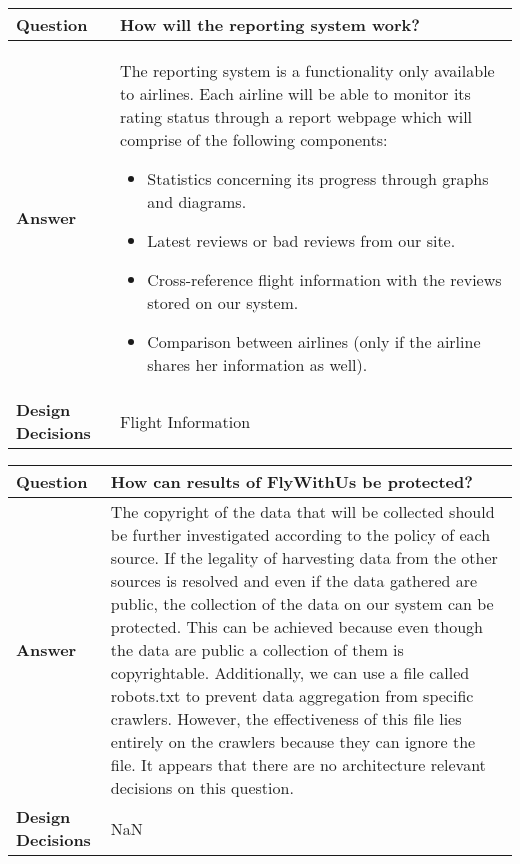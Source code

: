 \clearpage

\begin{longtable}{| l |  p{12cm} |}
\hline
\textbf{Question} & \textbf{How will the reporting system work?}  \\ \hline
\textbf{Answer} &
	The reporting system is a functionality only available to airlines. Each airline will be able to monitor its rating status through a report webpage which will comprise of the following components:
	\begin{itemize}
	\item Statistics concerning its progress through graphs and diagrams.
	\item Latest reviews or bad reviews from our site.
	\item Cross-reference flight information with the reviews stored on our system.
	\item Comparison between airlines (only if the airline shares her information as well).
	\end{itemize}
 \\ \hline
\textbf{Design Decisions} & Flight Information \\ \hline
\end{longtable}

\begin{longtable}{| l |  p{12cm} |}
\hline
\textbf{Question} & \textbf{How can results of FlyWithUs be protected?}  \\ \hline
\textbf{Answer} &
	The copyright of the data that will be collected should be further investigated according to the policy of each source. If the legality of 
harvesting data from the other sources is resolved and even if the data gathered are public, the collection of the data on our system can be protected. This can be achieved because 
even though the data are public a collection of them is copyrightable. Additionally, we can use a file called robots.txt to prevent data aggregation from specific crawlers. However, 
the effectiveness of this file lies entirely on the crawlers because they can ignore the file. It appears that there are no architecture relevant decisions on this question.
 \\ \hline
\textbf{Design Decisions} & NaN \\ \hline
\end{longtable}

